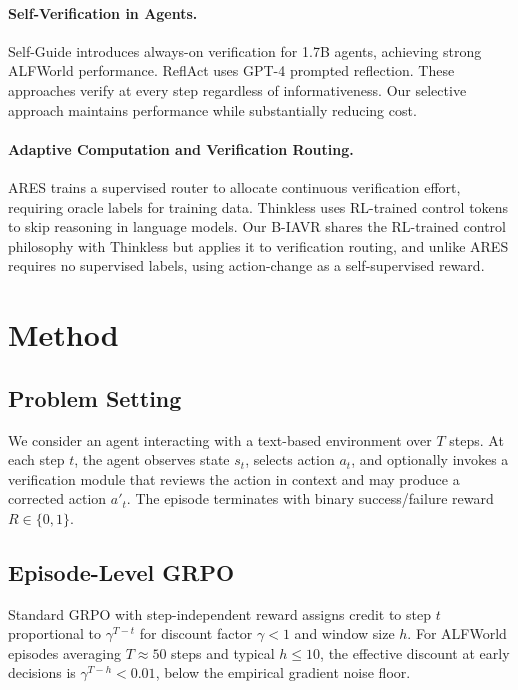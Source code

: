 \documentclass[11pt]{article}
\begin{document}
\paragraph{Self-Verification in Agents.}
Self-Guide introduces always-on verification for 1.7B agents, achieving strong ALFWorld performance. ReflAct uses GPT-4 prompted reflection. These approaches verify at every step regardless of informativeness. Our selective approach maintains performance while substantially reducing cost.

\paragraph{Adaptive Computation and Verification Routing.}
ARES trains a supervised router to allocate continuous verification effort, requiring oracle labels for training data. Thinkless uses RL-trained control tokens to skip reasoning in language models. Our B-IAVR shares the RL-trained control philosophy with Thinkless but applies it to verification routing, and unlike ARES requires no supervised labels, using action-change as a self-supervised reward.

\section{Method}

\subsection{Problem Setting}

We consider an agent interacting with a text-based environment over $T$ steps. At each step $t$, the agent observes state $s_t$, selects action $a_t$, and optionally invokes a verification module that reviews the action in context and may produce a corrected action $a'_t$. The episode terminates with binary success/failure reward $R \in \{0, 1\}$.

\subsection{Episode-Level GRPO}

Standard GRPO with step-independent reward assigns credit to step $t$ proportional to $\gamma^{T-t}$ for discount factor $\gamma < 1$ and window size $h$. For ALFWorld episodes averaging $T \approx 50$ steps and typical $h \leq 10$, the effective discount at early decisions is $\gamma^{T-h} < 0.01$, below the empirical gradient noise floor.
\end{document}
